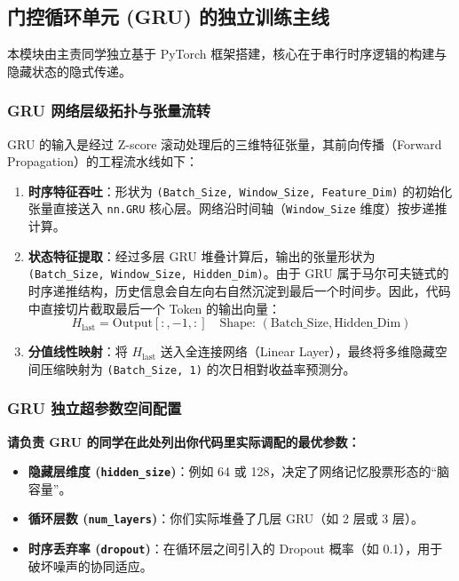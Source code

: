 \documentclass[9pt,a4paper,twoside]{rho-class/rho}
\begin{document}
    \subsection{门控循环单元 (GRU) 的独立训练主线}
    本模块由主责同学独立基于 PyTorch 框架搭建，核心在于串行时序逻辑的构建与隐藏状态的隐式传递。
    
    \subsubsection{GRU 网络层级拓扑与张量流转}
    GRU 的输入是经过 Z-score 滚动处理后的三维特征张量，其前向传播（Forward Propagation）的工程流水线如下：
    \begin{enumerate}
        \item \textbf{时序特征吞吐}：形状为 \texttt{(Batch\_Size, Window\_Size, Feature\_Dim)} 的初始化张量直接送入 \texttt{nn.GRU} 核心层。网络沿时间轴（\texttt{Window\_Size} 维度）按步递推计算。
        \item \textbf{状态特征提取}：经过多层 GRU 堆叠计算后，输出的张量形状为 \texttt{(Batch\_Size, Window\_Size, Hidden\_Dim)}。由于 GRU 属于马尔可夫链式的时序递推结构，历史信息会自左向右自然沉淀到最后一个时间步。因此，代码中直接切片截取最后一个 Token 的输出向量：
        \begin{equation}
            H_{\text{last}} = \text{Output}[:, -1, :] \quad \text{Shape: } (\text{Batch\_Size}, \text{Hidden\_Dim})
        \end{equation}
        \item \textbf{分值线性映射}：将 $H_{\text{last}}$ 送入全连接网络（Linear Layer），最终将多维隐藏空间压缩映射为 \texttt{(Batch\_Size, 1)} 的次日相對收益率预测分。
    \end{enumerate}

    \subsubsection{GRU 独立超参数空间配置}
    \begin{rhoenv}[frametitle=填写建议：GRU 独有超参数]
    \textbf{请负责 GRU 的同学在此处列出你代码里实际调配的最优参数：}
    \begin{itemize}
        \item \textbf{隐藏层维度 (\texttt{hidden\_size})}：例如 64 或 128，决定了网络记忆股票形态的“脑容量”。
        \item \textbf{循环层数 (\texttt{num\_layers})}：你们实际堆叠了几层 GRU（如 2 层或 3 层）。
        \item \textbf{时序丢弃率 (\texttt{dropout})}：在循环层之间引入的 Dropout 概率（如 0.1），用于破坏噪声的协同适应。
    \end{itemize}
    \end{rhoenv}
\end{document}
